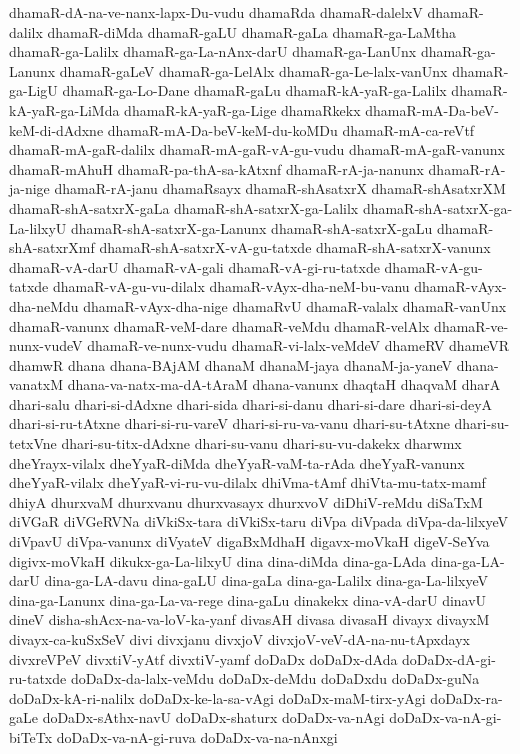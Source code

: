 {dhamaR-dA-na-ve-nanx-lapx-Du-vudu
dhamaRda
dhamaR-dalelxV
dhamaR-dalilx
dhamaR-diMda
dhamaR-gaLU
dhamaR-gaLa
dhamaR-ga-LaMtha
dhamaR-ga-Lalilx
dhamaR-ga-La-nAnx-darU
dhamaR-ga-LanUnx
dhamaR-ga-Lanunx
dhamaR-gaLeV
dhamaR-ga-LelAlx
dhamaR-ga-Le-lalx-vanUnx
dhamaR-ga-LigU
dhamaR-ga-Lo-Dane
dhamaR-gaLu
dhamaR-kA-yaR-ga-Lalilx
dhamaR-kA-yaR-ga-LiMda
dhamaR-kA-yaR-ga-Lige
dhamaRkekx
dhamaR-mA-Da-beV-keM-di-dAdxne
dhamaR-mA-Da-beV-keM-du-koMDu
dhamaR-mA-ca-reVtf
dhamaR-mA-gaR-dalilx
dhamaR-mA-gaR-vA-gu-vudu
dhamaR-mA-gaR-vanunx
dhamaR-mAhuH
dhamaR-pa-thA-sa-kAtxnf
dhamaR-rA-ja-nanunx
dhamaR-rA-ja-nige
dhamaR-rA-janu
dhamaRsayx
dhamaR-shAsatxrX
dhamaR-shAsatxrXM
dhamaR-shA-satxrX-gaLa
dhamaR-shA-satxrX-ga-Lalilx
dhamaR-shA-satxrX-ga-La-lilxyU
dhamaR-shA-satxrX-ga-Lanunx
dhamaR-shA-satxrX-gaLu
dhamaR-shA-satxrXmf
dhamaR-shA-satxrX-vA-gu-tatxde
dhamaR-shA-satxrX-vanunx
dhamaR-vA-darU
dhamaR-vA-gali
dhamaR-vA-gi-ru-tatxde
dhamaR-vA-gu-tatxde
dhamaR-vA-gu-vu-dilalx
dhamaR-vAyx-dha-neM-bu-vanu
dhamaR-vAyx-dha-neMdu
dhamaR-vAyx-dha-nige
dhamaRvU
dhamaR-valalx
dhamaR-vanUnx
dhamaR-vanunx
dhamaR-veM-dare
dhamaR-veMdu
dhamaR-velAlx
dhamaR-ve-nunx-vudeV
dhamaR-ve-nunx-vudu
dhamaR-vi-lalx-veMdeV
dhameRV
dhameVR
dhamwR
dhana
dhana-BAjAM
dhanaM
dhanaM-jaya
dhanaM-ja-yaneV
dhana-vanatxM
dhana-va-natx-ma-dA-tAraM
dhana-vanunx
dhaqtaH
dhaqvaM
dharA
dhari-salu
dhari-si-dAdxne
dhari-sida
dhari-si-danu
dhari-si-dare
dhari-si-deyA
dhari-si-ru-tAtxne
dhari-si-ru-vareV
dhari-si-ru-va-vanu
dhari-su-tAtxne
dhari-su-tetxVne
dhari-su-titx-dAdxne
dhari-su-vanu
dhari-su-vu-dakekx
dharwmx
dheYrayx-vilalx
dheYyaR-diMda
dheYyaR-vaM-ta-rAda
dheYyaR-vanunx
dheYyaR-vilalx
dheYyaR-vi-ru-vu-dilalx
dhiVma-tAmf
dhiVta-mu-tatx-mamf
dhiyA
dhurxvaM
dhurxvanu
dhurxvasayx
dhurxvoV
diDhiV-reMdu
diSaTxM
diVGaR
diVGeRVNa
diVkiSx-tara
diVkiSx-taru
diVpa
diVpada
diVpa-da-lilxyeV
diVpavU
diVpa-vanunx
diVyateV
digaBxMdhaH
digavx-moVkaH
digeV-SeYva
digivx-moVkaH
dikukx-ga-La-lilxyU
dina
dina-diMda
dina-ga-LAda
dina-ga-LA-darU
dina-ga-LA-davu
dina-gaLU
dina-gaLa
dina-ga-Lalilx
dina-ga-La-lilxyeV
dina-ga-Lanunx
dina-ga-La-va-rege
dina-gaLu
dinakekx
dina-vA-darU
dinavU
dineV
disha-shAcx-na-va-loV-ka-yanf
divasAH
divasa
divasaH
divayx
divayxM
divayx-ca-kuSxSeV
divi
divxjanu
divxjoV
divxjoV-veV-dA-na-nu-tApxdayx
divxreVPeV
divxtiV-yAtf
divxtiV-yamf
doDaDx
doDaDx-dAda
doDaDx-dA-gi-ru-tatxde
doDaDx-da-lalx-veMdu
doDaDx-deMdu
doDaDxdu
doDaDx-guNa
doDaDx-kA-ri-nalilx
doDaDx-ke-la-sa-vAgi
doDaDx-maM-tirx-yAgi
doDaDx-ra-gaLe
doDaDx-sAthx-navU
doDaDx-shaturx
doDaDx-va-nAgi
doDaDx-va-nA-gi-biTeTx
doDaDx-va-nA-gi-ruva
doDaDx-va-na-nAnxgi
}
